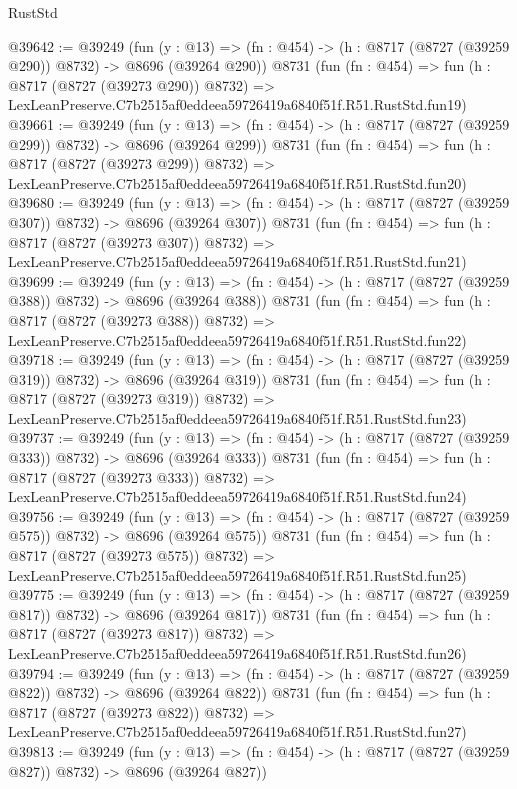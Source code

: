 \begin{lexlean}{RustStd}
\begin{coremodule}
@39642 := @39249
    (fun (y : @13) => (fn : @454) -> (h : @8717 (@8727 (@39259 @290)) @8732) -> @8696 (@39264 @290))
    @8731
    (fun (fn : @454) =>
    fun (h : @8717 (@8727 (@39273 @290)) @8732) =>
    LexLeanPreserve.C7b2515af0eddeea59726419a6840f51f.R51.RustStd.fun19)
@39661 := @39249
    (fun (y : @13) => (fn : @454) -> (h : @8717 (@8727 (@39259 @299)) @8732) -> @8696 (@39264 @299))
    @8731
    (fun (fn : @454) =>
    fun (h : @8717 (@8727 (@39273 @299)) @8732) =>
    LexLeanPreserve.C7b2515af0eddeea59726419a6840f51f.R51.RustStd.fun20)
@39680 := @39249
    (fun (y : @13) => (fn : @454) -> (h : @8717 (@8727 (@39259 @307)) @8732) -> @8696 (@39264 @307))
    @8731
    (fun (fn : @454) =>
    fun (h : @8717 (@8727 (@39273 @307)) @8732) =>
    LexLeanPreserve.C7b2515af0eddeea59726419a6840f51f.R51.RustStd.fun21)
@39699 := @39249
    (fun (y : @13) => (fn : @454) -> (h : @8717 (@8727 (@39259 @388)) @8732) -> @8696 (@39264 @388))
    @8731
    (fun (fn : @454) =>
    fun (h : @8717 (@8727 (@39273 @388)) @8732) =>
    LexLeanPreserve.C7b2515af0eddeea59726419a6840f51f.R51.RustStd.fun22)
@39718 := @39249
    (fun (y : @13) => (fn : @454) -> (h : @8717 (@8727 (@39259 @319)) @8732) -> @8696 (@39264 @319))
    @8731
    (fun (fn : @454) =>
    fun (h : @8717 (@8727 (@39273 @319)) @8732) =>
    LexLeanPreserve.C7b2515af0eddeea59726419a6840f51f.R51.RustStd.fun23)
@39737 := @39249
    (fun (y : @13) => (fn : @454) -> (h : @8717 (@8727 (@39259 @333)) @8732) -> @8696 (@39264 @333))
    @8731
    (fun (fn : @454) =>
    fun (h : @8717 (@8727 (@39273 @333)) @8732) =>
    LexLeanPreserve.C7b2515af0eddeea59726419a6840f51f.R51.RustStd.fun24)
@39756 := @39249
    (fun (y : @13) => (fn : @454) -> (h : @8717 (@8727 (@39259 @575)) @8732) -> @8696 (@39264 @575))
    @8731
    (fun (fn : @454) =>
    fun (h : @8717 (@8727 (@39273 @575)) @8732) =>
    LexLeanPreserve.C7b2515af0eddeea59726419a6840f51f.R51.RustStd.fun25)
@39775 := @39249
    (fun (y : @13) => (fn : @454) -> (h : @8717 (@8727 (@39259 @817)) @8732) -> @8696 (@39264 @817))
    @8731
    (fun (fn : @454) =>
    fun (h : @8717 (@8727 (@39273 @817)) @8732) =>
    LexLeanPreserve.C7b2515af0eddeea59726419a6840f51f.R51.RustStd.fun26)
@39794 := @39249
    (fun (y : @13) => (fn : @454) -> (h : @8717 (@8727 (@39259 @822)) @8732) -> @8696 (@39264 @822))
    @8731
    (fun (fn : @454) =>
    fun (h : @8717 (@8727 (@39273 @822)) @8732) =>
    LexLeanPreserve.C7b2515af0eddeea59726419a6840f51f.R51.RustStd.fun27)
@39813 := @39249
    (fun (y : @13) => (fn : @454) -> (h : @8717 (@8727 (@39259 @827)) @8732) -> @8696 (@39264 @827))

\end{coremodule}
\end{lexlean}
